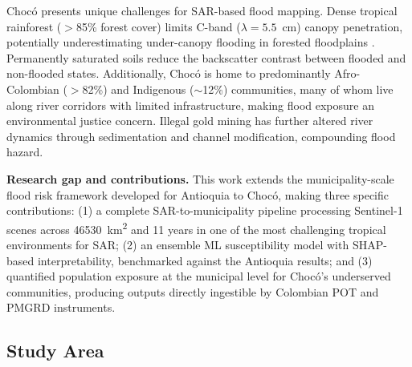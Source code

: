 \documentclass{article}
\begin{document}
Choc\'o presents unique challenges for SAR-based flood mapping. Dense tropical rainforest ($>$85\% forest cover) limits C-band ($\lambda = 5.5$~cm) canopy penetration, potentially underestimating under-canopy flooding in forested floodplains \citep{PalominoAngel2019}. Permanently saturated soils reduce the backscatter contrast between flooded and non-flooded states. Additionally, Choc\'o is home to predominantly Afro-Colombian ($>$82\%) and Indigenous ($\sim$12\%) communities, many of whom live along river corridors with limited infrastructure, making flood exposure an environmental justice concern. Illegal gold mining has further altered river dynamics through sedimentation and channel modification, compounding flood hazard.

\textbf{Research gap and contributions.} This work extends the municipality-scale flood risk framework developed for Antioquia \citep{EspinalMaya2026} to Choc\'o, making three specific contributions: (1) a complete SAR-to-municipality pipeline processing Sentinel-1 scenes across \SI{46530}{\kilo\metre\squared} and 11 years in one of the most challenging tropical environments for SAR; (2) an ensemble ML susceptibility model with SHAP-based interpretability, benchmarked against the Antioquia results; and (3) quantified population exposure at the municipal level for Choc\'o's underserved communities, producing outputs directly ingestible by Colombian POT and PMGRD instruments.

\subsection{Study Area}
\label{sec:study_area}

\end{document}
